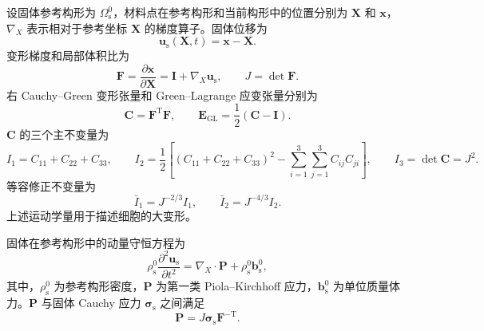 设固体参考构形为 $\Omega_{\mathrm s}^0$，材料点在参考构形和当前构形中的位置分别为 $\boldsymbol{X}$ 和 $\boldsymbol{x}$，$\nabla_{\!X}$ 表示相对于参考坐标 $\boldsymbol{X}$ 的梯度算子。固体位移为
\begin{equation}
\boldsymbol{u}_{\mathrm s}(\boldsymbol{X},t)
=
\boldsymbol{x}-\boldsymbol{X}.
\label{eq:ch2_solid_motion}
\end{equation}
变形梯度和局部体积比为
\begin{equation}
\boldsymbol{F}
=
\frac{\partial\boldsymbol{x}}{\partial\boldsymbol{X}}
=
\boldsymbol{I}
+
\nabla_{\!X}\boldsymbol{u}_{\mathrm s},
\qquad
J=\det\boldsymbol{F}.
\label{eq:ch2_deformation_gradient}
\end{equation}
右 Cauchy--Green 变形张量和 Green--Lagrange 应变张量分别为
\begin{equation}
\boldsymbol{C}
=
\boldsymbol{F}^{\mathrm T}\boldsymbol{F},
\qquad
\boldsymbol{E}_{\mathrm{GL}}
=
\frac{1}{2}\left(\boldsymbol{C}-\boldsymbol{I}\right).
\label{eq:ch2_strain_tensors}
\end{equation}
$\boldsymbol{C}$ 的三个主不变量为
\begin{equation}
I_1=C_{11}+C_{22}+C_{33},
\qquad
I_2=
\frac{1}{2}
\left[
\left(C_{11}+C_{22}+C_{33}\right)^2
-
\sum_{i=1}^{3}\sum_{j=1}^{3}C_{ij}C_{ji}
\right],
\qquad
I_3=\det\boldsymbol{C}=J^2.
\label{eq:ch2_invariants}
\end{equation}
等容修正不变量为
\begin{equation}
\bar I_1=J^{-2/3}I_1,
\qquad
\bar I_2=J^{-4/3}I_2.
\label{eq:ch2_modified_invariants}
\end{equation}
上述运动学量用于描述细胞的大变形\cite{holzapfel2000nonlinear,ogden1997nonlinear,bonet2008nonlinear}。

固体在参考构形中的动量守恒方程为
\begin{equation}
\rho_{\mathrm s}^0
\frac{\partial^2\boldsymbol{u}_{\mathrm s}}{\partial t^2}
=
\nabla_{\!X}\cdot\boldsymbol{P}
+
\rho_{\mathrm s}^0\boldsymbol{b}_{\mathrm s}^0,
\label{eq:ch2_solid_momentum_reference}
\end{equation}
其中，$\rho_{\mathrm s}^0$ 为参考构形密度，$\boldsymbol{P}$ 为第一类 Piola--Kirchhoff 应力，$\boldsymbol{b}_{\mathrm s}^0$ 为单位质量体力。$\boldsymbol{P}$ 与固体 Cauchy 应力 $\boldsymbol{\sigma}_{\mathrm s}$ 之间满足
\begin{equation}
\boldsymbol{P}
=
J\boldsymbol{\sigma}_{\mathrm s}\boldsymbol{F}^{-\mathrm T}.
\label{eq:ch2_stress_transform}
\end{equation}

